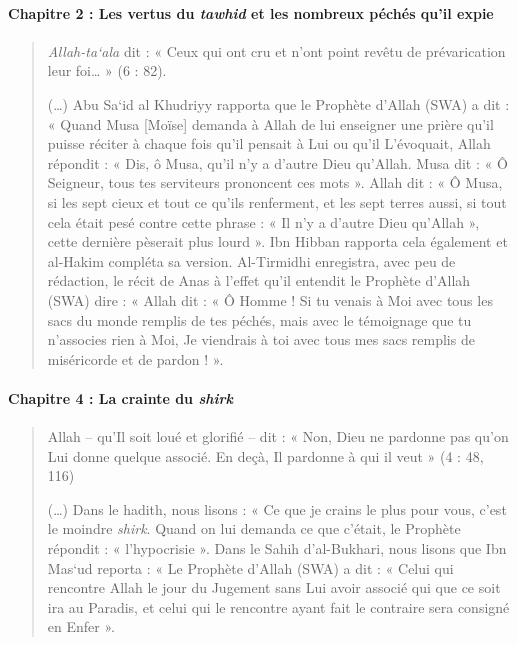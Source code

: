 \paragraph{{Chapitre 2} : Les vertus du \emph{tawhid} et les
nombreux péchés qu'il expie}
\begin{quote}


\emph{Allah-ta`ala} dit : « Ceux qui ont cru et n'ont point revêtu de
prévarication leur foi\ldots{} » (6 : 82).

(\ldots) Abu Sa`id al Khudriyy rapporta que le Prophète d'Allah (SWA) a
dit : « Quand Musa {[}Moïse{]} demanda à Allah de lui enseigner une
prière qu'il puisse réciter à chaque fois qu'il pensait à Lui ou qu'il
L'évoquait, Allah répondit : « Dis, ô Musa, qu'il n'y a d'autre Dieu
qu'Allah. Musa dit : « Ô Seigneur, tous tes serviteurs prononcent ces
mots ». Allah dit : « Ô Musa, si les sept cieux et tout ce qu'ils
renferment, et les sept terres aussi, si tout cela était pesé contre
cette phrase : « Il n'y a d'autre Dieu qu'Allah », cette dernière
pèserait plus lourd ». Ibn Hibban rapporta cela également et al-Hakim
compléta sa version. Al-Tirmidhi enregistra, avec peu de rédaction, le
récit de Anas à l'effet qu'il entendit le Prophète d'Allah (SWA) dire :
« Allah dit : « Ô Homme ! Si tu venais à Moi avec tous les sacs du monde
remplis de tes péchés, mais avec le témoignage que tu n'associes rien à
Moi, Je viendrais à toi avec tous mes sacs remplis de miséricorde et de
pardon ! ».

    
\end{quote}
\paragraph{{Chapitre 4} : La crainte du \emph{shirk}}
\begin{quote}
Allah -- qu'Il soit loué et glorifié -- dit : « Non, Dieu ne pardonne
pas qu'on Lui donne quelque associé. En deçà, Il pardonne à qui il veut
» (4 : 48, 116)

(\ldots) Dans le hadith, nous lisons : « Ce que je crains le plus pour
vous, c'est le moindre \emph{shirk}. Quand on lui demanda ce que
c'était, le Prophète répondit : « l'hypocrisie ». Dans le Sahih
d'al-Bukhari, nous lisons que Ibn Mas`ud reporta : « Le Prophète d'Allah
(SWA) a dit : « Celui qui rencontre Allah le jour du Jugement sans Lui
avoir associé qui que ce soit ira au Paradis, et celui qui le rencontre
ayant fait le contraire sera consigné en Enfer ».
\end{quote}
